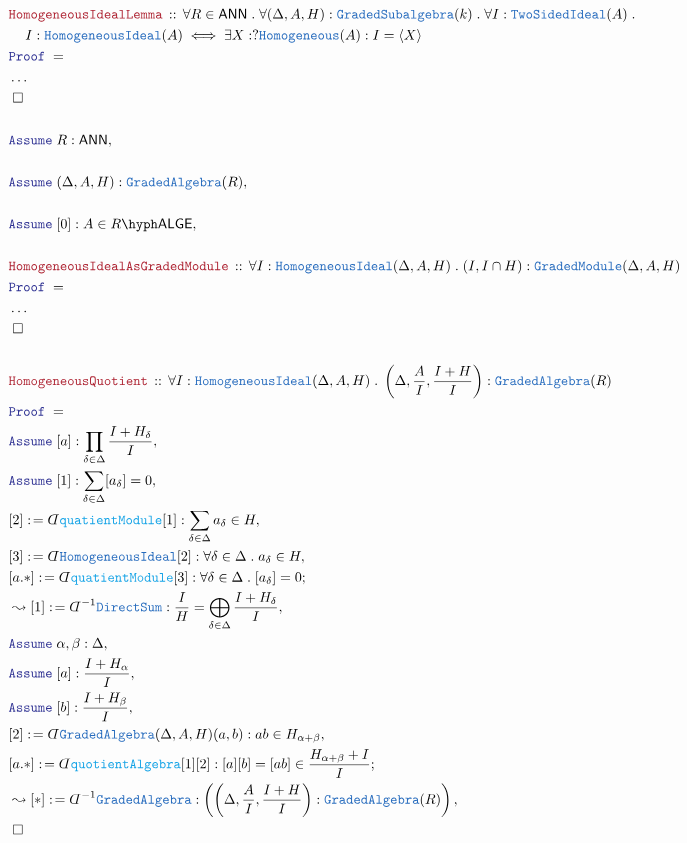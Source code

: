 \documentclass[12pt]{scrartcl}%
\newcommand{\TYPE}[1]{\textcolor{NavyBlue}{\mathtt{#1}}}%
\newcommand{\FUNC}[1]{\textcolor{Cerulean}{\mathtt{#1}}}%
\newcommand{\LOGIC}[1]{\textcolor{Blue}{\mathtt{#1}}}%
\newcommand{\THM}[1]{\textcolor{Maroon}{\mathtt{#1}}}%
\renewcommand{\.}{\; . \;} %
\newcommand{\de}{: \kern 0.1pc =} %
\newcommand{\Theorem}[2]{& \THM{#1} \, :: \, #2 \\ & \Proof = \\ } %
\newcommand{\NewLine}{\\ & \kern 1pc}%
\newcommand{\Page}[1]{ \begin{align*} #1 \end{align*}  }%
\newcommand{ \bd }{ \ByDef }%
\newcommand{\NoProof}{ & \ldots \\ \EndProof}%
\newcommand{\Say}[3]{& #1 \de #2 : #3, \\} %
\newcommand{\Conclude}[3]{& #1 \de #2 : #3; \\}%
\newcommand{\Derive}[3]{& \leadsto #1 \de #2 : #3, \\} %
\newcommand{\Assume}[2]{& \LOGIC{Assume} \; #1 : #2, \\} %
\newcommand{\QED}{\; \square} %
\newcommand{\EndProof}{& \QED \\} %
\newcommand{\ByDef}{\rotatebox[origin=c]{-180}{$D$}}%
\newcommand{\Proof}{\LOGIC{Proof} \; } %
\newcommand{\ANN}{\mathsf{ANN}} %
\newcommand{\LALGE}[1]{#1\hyph\mathsf{ALGE}}%
\begin{document}
\Page{
	\Theorem{HomogeneousIdealLemma}{ 
		\forall R \in \ANN \. 
		\forall (\Delta,A,H) : \TYPE{GradedSubalgebra}(k) \. 
		\forall I : \TYPE{TwoSidedIdeal}(A) \. \NewLine
		I : \TYPE{HomogeneousIdeal}(A) \iff \exists X : ?\TYPE{Homogeneous}(A) : I = \langle X \rangle 
	}
	\NoProof
	\\
	\Assume{R}{\ANN}
	\\
	\Assume{(\Delta,A,H)}{\TYPE{GradedAlgebra}(R)}
	\\
	\Assume{[0]}{A \in \LALGE{R}}
	\\
	\Theorem{HomogeneousIdealAsGradedModule}{\forall I : \TYPE{HomogeneousIdeal}(\Delta,A,H) \. (I,I \cap H) : \TYPE{GradedModule}(\Delta,A,H)}
	\NoProof
	\\
	\Theorem{HomogeneousQuotient}{\forall I : \TYPE{HomogeneousIdeal}(\Delta,A,H) \. \left( \Delta, \frac{A}{I}, \frac{I + H}{I}  \right) : \TYPE{GradedAlgebra}(R)}
	\Assume{[a]}{\prod_{\delta \in \Delta} \frac{I + H_\delta}{I}}
	\Assume{[1]}{\sum_{\delta \in \Delta} [a_\delta] = 0}
	\Say{[2]}{\bd \FUNC{quatientModule}[1]}{\sum_{\delta \in \Delta} a_\delta \in H}
	\Say{[3]}{\bd \TYPE{HomogeneousIdeal}[2]}{ \forall \delta \in \Delta \. a_\delta \in H }
	\Conclude{[a.*]}{\bd \FUNC{quatientModule}[3]}{ \forall \delta \in \Delta \. [a_\delta] = 0}
	\Derive{[1]}{\bd^{-1}\TYPE{DirectSum}}{\frac{I}{H} = \bigoplus_{\delta \in \Delta} \frac{I + H_\delta }{I}}
	\Assume{\alpha,\beta}{\Delta}
	\Assume{[a]}{\frac{I + H_\alpha}{I}}
	\Assume{[b]}{\frac{I + H_\beta}{I}}
	\Say{[2]}{\bd \TYPE{GradedAlgebra}(\Delta,A,H)(a,b)}{ab \in H_{\alpha + \beta}}
	\Conclude{[a.*]}{\bd \FUNC{quotientAlgebra}[1][2]}{[a][b] = [ab] \in \frac{H_{\alpha+\beta} + I }{I}}
	\Derive{[*]}{\bd^{-1}\TYPE{GradedAlgebra}}{\left( \left(\Delta, \frac{A}{I},\frac{I + H}{I} \right) : \TYPE{GradedAlgebra}(R)  \right)}
	\EndProof
}
\end{document}
